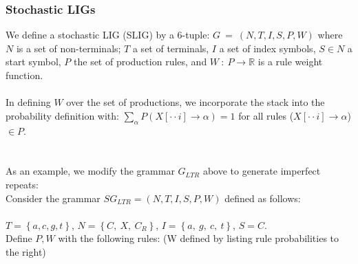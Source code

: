 \documentclass[11pt]{article}
\begin{document}
\subsubsection {Stochastic LIGs}
We define a stochastic LIG (SLIG) by a 6-tuple: $G \ = \ (N, T, I, S, P, W)$ where $N$ is a set of non-terminals; $T$ a set of terminals, $I$ a set of index symbols,
$S \in N$ a start symbol, $P$ the set of production rules, and $W \ : \ P \rightarrow \mathds{R}$ is a rule weight function. \\ \\
In defining $W$ over the set of productions, we incorporate the stack into the probability definition with: $\displaystyle\sum\limits_{\alpha}^{} P(X[\cdot \cdot i] \rightarrow \alpha) = 1$ for all rules ($X[\cdot \cdot i] \rightarrow \alpha$) $\in P$. \\ \\
\ \\
As an example, we modify the grammar $G_{LTR}$ above to generate imperfect repeats:\\
Consider the grammar $SG_{LTR} = (N, T, I, S, P, W)$ defined as follows: \\ \\
$T = \left\{a,c,g,t\right\}$, $N = \left\{C, \ X, \ C_R\right\}$, $I = \left\{a, \ g, \ c, \ t\right\}$,
$S = C$. \\
Define $P, W$ with the following rules: (W defined by listing rule probabilities to the right)
\end{document}
